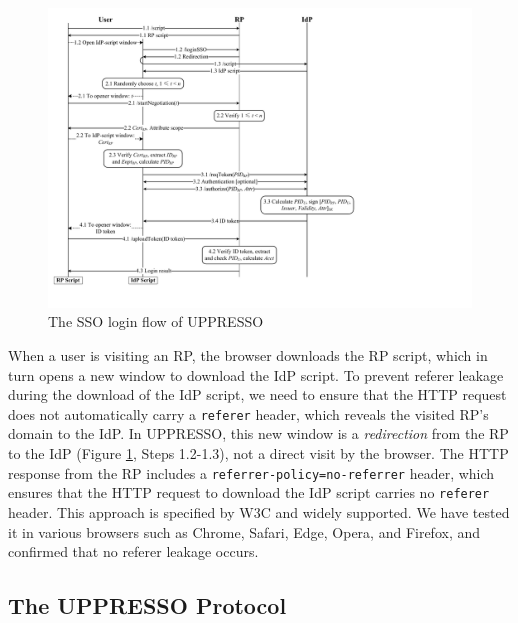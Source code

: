\begin{figure}[htb]
  \centering
  \includegraphics[height=0.575\textheight]{fig/process-js.pdf}
  \caption{The SSO login flow of UPPRESSO}
  \label{fig:process}
\end{figure}

When a user is visiting an RP, the browser downloads the RP script, which in turn opens a new window to download the IdP script. To prevent referer leakage during the download of the IdP script, we need to ensure that the HTTP request does not automatically carry a \verb+referer+ header, which reveals the visited RP's domain to the IdP. %
In UPPRESSO, this new window is a \emph{redirection} from the RP to the IdP (Figure \ref{fig:process}, Steps 1.2-1.3), not a direct visit by the browser.
The HTTP response from the RP includes a \verb+referrer-policy=no-referrer+ header, which ensures that the HTTP request to download the IdP script carries no \verb+referer+ header.
This approach is specified by W3C \cite{referer_policy} and widely supported. We have tested it in various browsers such as Chrome, Safari, Edge, Opera, and Firefox, and confirmed that no referer leakage occurs.




\subsection{The UPPRESSO Protocol}
\label{implementations}

